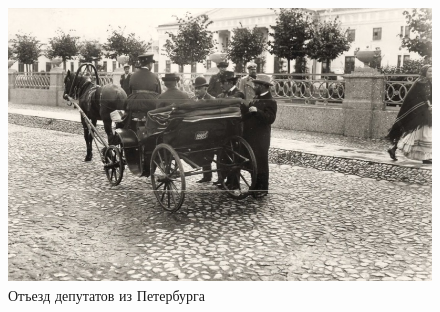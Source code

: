 \begin{figure}[h!tb] 
	\centering\includegraphics[scale=0.5]{Vozzvanie/xiieDslZycs.jpg}
	\caption{Отъезд депутатов из Петербурга	}%
\end{figure}

